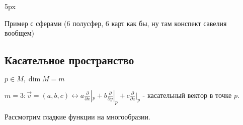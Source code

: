 
\parindent 5px

\usepackage{amsfonts, amssymb, amsmath, mathtools, amsthm}  %
\usepackage{mathrsfs}


\renewcommand{\baselinestretch}{1.3} 
\DeclareMathOperator{\tp}{Tp}
\DeclareMathOperator{\tm}{TM}
\setcounter{lemma}{0}


  Пример с сферами (6 полусфер, 6 карт как бы, ну там конспект савелия вообщем)

  \subsection*{Касательное пространство} 

  $p \in M, \dim M = m$

  \begin{illustration}
    $m = 3: \vec v = (a,b,c) \leftrightarrow a \frac{\partial}{\partial x} |_p + b\frac{\partial}{\partial y}|_p + c\frac{\partial}{\partial z}|_p$ - касательный вектор в точке $p$.

  \end{illustration}
    Рассмотрим гладкие функции на многообразии.

